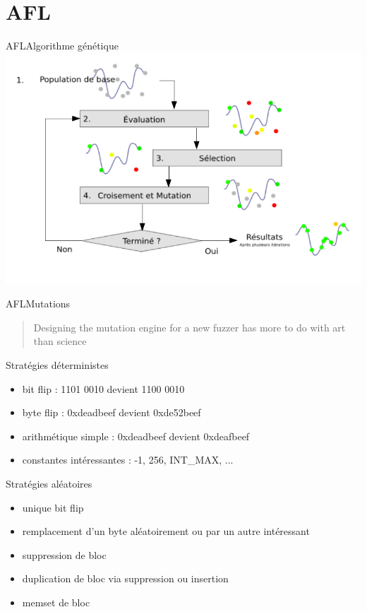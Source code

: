 \section{AFL}

\begin{frame}{AFL}{Algorithme génétique}
  \includegraphics[width=\textwidth]{../medias/schema_genetique.png}
\end{frame}

\begin{frame}{AFL}{Mutations}
  \begin{quote}\Large
  Designing the mutation engine for a new fuzzer has more to do with art than science
  \end{quote}
  \begin{exampleblock}{Stratégies déterministes}
    \begin{itemize}
      \item{bit flip : 1101 0010 devient 1100 0010}
      \item{byte flip : 0xdeadbeef devient 0xde52beef}
      \item{arithmétique simple : 0xdeadbeef devient 0xdeafbeef}
      \item{constantes intéressantes : -1, 256, INT\_MAX, ...}
    \end{itemize}
  \end{exampleblock}
  \begin{exampleblock}{Stratégies aléatoires}
    \begin{itemize}
      \item{unique bit flip}
      \item{remplacement d'un byte aléatoirement ou par un autre intéressant}
      \item{suppression de bloc}
      \item{duplication de bloc via suppression ou insertion}
      \item{memset de bloc}
    \end{itemize}
  \end{exampleblock}
\end{frame}

